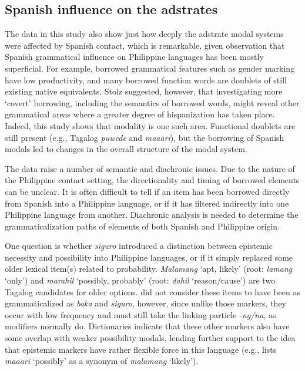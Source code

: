 \documentclass[output=paper,colorlinks,citecolor=brown]{langscibook}
\begin{document}
\subsection{Spanish influence on the adstrates}

The data in this study also show just how deeply the adstrate modal systems were affected by Spanish contact, which is remarkable, given  observation that Spanish grammatical influence on Philippine languages has been mostly superficial. For example, borrowed grammatical features such as gender marking have low productivity, and many borrowed function words are doublets of still existing native equivalents. Stolz suggested, however, that investigating more ‘covert’ borrowing, including the semantics of borrowed words, might reveal other grammatical areas where a greater degree of hispanization has taken place. Indeed, this study shows that modality is one such area. Functional doublets are still present (e.g., Tagalog \textit{puwede} and \textit{maaari}), but the borrowing of Spanish modals led to changes in the overall structure of the modal system.

The data raise a number of semantic and diachronic issues. Due to the nature of the Philippine contact setting, the directionality and timing of borrowed elements can be unclear. It is often difficult to tell if an item has been borrowed directly from Spanish into a Philippine language, or if it has filtered indirectly into one Philippine language from another. Diachronic analysis is needed to determine the grammaticalization paths of elements of both Spanish and Philippine origin. 

One question is whether \textit{siguro} introduced a distinction between epistemic necessity and possibility into Philippine languages, or if it simply replaced some older lexical item(s) related to probability. \textit{Malamang} ‘apt, likely’ (root: \textit{lamang} ‘only’) and \textit{marahil} ‘possibly, probably’ (root: \textit{dahil} ‘reason/cause’) are two Tagalog candidates for older options. \citet{BaderWymann1994} did not consider these items to have been as grammaticalized as \textit{baka} and \textit{siguro}, however, since unlike those markers, they occur with low frequency and must still take the linking particle \textit{{}-ng/na}, as modifiers normally do. Dictionaries indicate that these other markers also have some overlap with weaker possibility modals, lending further support to the idea that epistemic markers have rather flexible force in this language (e.g., \cite[765]{English2010} lists \textit{maaari} ‘possibly’ as a synonym of \textit{malamang} ‘likely'). 
\end{document}
